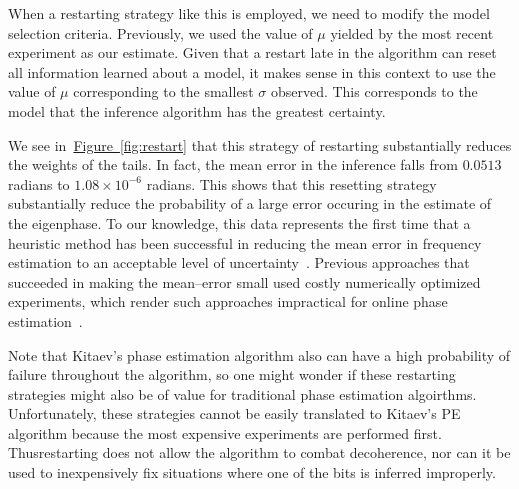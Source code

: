 \documentclass[aps,pra,amsmath,twocolumn,amssymb,superscriptaddress]{revtex4-1}
\newcommand{\fig}[1]{\hyperref[fig:#1]{Figure~\ref*{fig:#1}}}
\providecommand{\DIFaddtex}[1]{{\protect\color{blue}\uwave{#1}}} %
\providecommand{\DIFaddbegin}{} %
\providecommand{\DIFaddend}{} %
\providecommand{\DIFadd}[1]{\texorpdfstring{\DIFaddtex{#1}}{#1}} %
\begin{document}
When a restarting strategy like this is employed, we need to modify the model selection criteria.  Previously, we used the value of $\mu$ yielded by the most recent experiment as our estimate.   Given that a restart late in the algorithm can reset all information learned about a model, it makes sense in this context to use the value of $\mu$ corresponding to the smallest $\sigma$ observed.  This corresponds to the model that the inference algorithm has the greatest certainty.

We see in~\fig{restart} that this strategy of restarting substantially reduces the weights of the tails.  In fact, the mean error in the inference falls from $0.0513$ radians to $1.08\times 10^{-6}$ radians.  This shows that this resetting strategy substantially reduce the probability of a large error occuring in the estimate of the eigenphase.  To our knowledge, this data represents the first time that a heuristic method has been successful in reducing the mean error in frequency estimation to an acceptable level of uncertainty~\cite{granade_robust_2012}.  Previous approaches that succeeded in making the mean--error small used costly numerically optimized experiments, which render such approaches impractical for online phase estimation~\cite{granade_robust_2012,ferrie_how_2013, wiebe_hamiltonian_2014,wiebe_quantum_2014-1,WGC15}.

Note that Kitaev's phase estimation algorithm also can have a high probability of failure throughout the algorithm, so one might wonder if these restarting strategies might also be of value for traditional phase estimation algoirthms.  Unfortunately, these strategies cannot be easily translated to Kitaev's PE algorithm because the most expensive experiments are performed first.  Thus\DIFaddbegin \DIFadd{, }\DIFaddend restarting does not allow the algorithm to combat decoherence, nor can it be used to inexpensively fix situations where one of the bits is inferred improperly.
\end{document}
